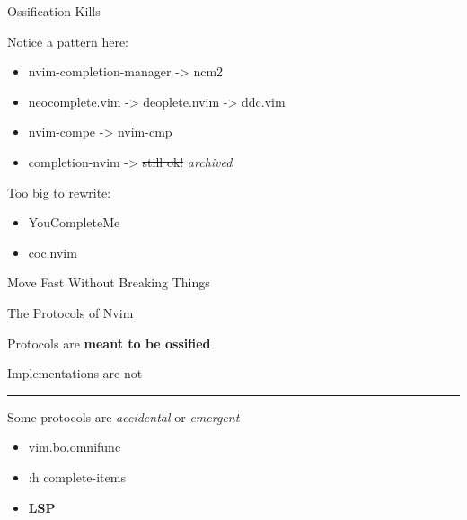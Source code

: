 \documentclass{beamer}
\begin{document}
\begin{frame}{Ossification Kills}

	Notice a pattern here:

	\begin{itemize}

		\item nvim-completion-manager -> ncm2

		\item neocomplete.vim -> deoplete.nvim -> ddc.vim

		\item nvim-compe -> nvim-cmp

		\item completion-nvim -> \st{still ok!} \textit{archived}

	\end{itemize}

	Too big to rewrite:

	\begin{itemize}

		\item YouCompleteMe

		\item coc.nvim

	\end{itemize}

\end{frame}


\begin{frame}[standout]

	Move Fast Without Breaking Things

\end{frame}


\begin{frame}{The Protocols of Nvim}

	Protocols are \textbf{meant to be ossified}

	Implementations are not

	\rule{\textwidth}{0.1em}

	Some protocols are \textit{accidental} or \textit{emergent}

	\begin{itemize}

		\item vim.bo.omnifunc

		\item :h complete-items

		\item \textbf{LSP}

	\end{itemize}

\end{frame}
\end{document}
